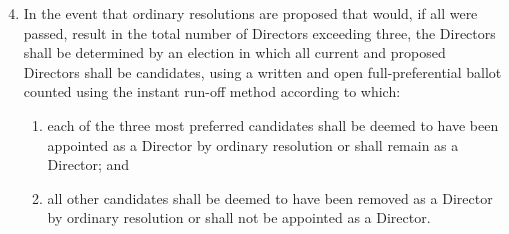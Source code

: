 \documentclass[a4paper,10pt]{article}
\begin{document}
\begin{framed}
  \begin{enumerate}
    \setcounter{enumi}{3}
    \renewcommand{\labelenumi}{23.\arabic{enumi}}
    \item In the event that ordinary resolutions are proposed that would, if all were passed, result in the total number of Directors exceeding three, the Directors shall be determined by an election in which all current and proposed Directors shall be candidates, using a written and open full-preferential ballot counted using the instant run-off method according to which:
    \begin{enumerate}
      \renewcommand{\labelenumii}{(\alph{enumii})}
      \item each of the three most preferred candidates shall be deemed to have been appointed as a Director by ordinary resolution or shall remain as a Director; and
      \item all other candidates shall be deemed to have been removed as a Director by ordinary resolution or shall not be appointed as a Director.
    \end{enumerate}
  \end{enumerate}
\end{framed}
\end{document}
